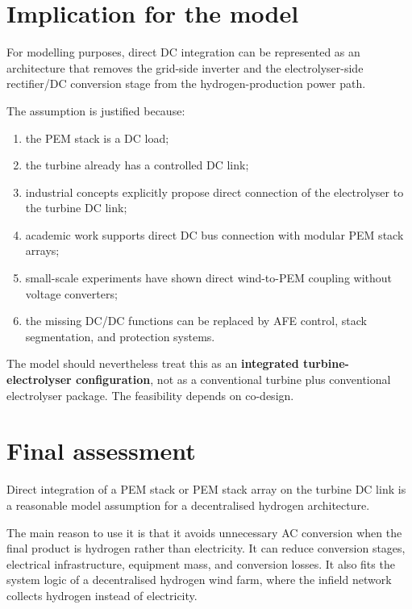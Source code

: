 \documentclass[
  letterpaper,
  DIV=11,
  numbers=noendperiod]{scrartcl}
\providecommand{\tightlist}{%
  \setlength{\itemsep}{0pt}\setlength{\parskip}{0pt}}
\begin{document}
\section{Implication for the model}\label{implication-for-the-model}

For modelling purposes, direct DC integration can be represented as an
architecture that removes the grid-side inverter and the
electrolyser-side rectifier/DC conversion stage from the
hydrogen-production power path.

The assumption is justified because:

\begin{enumerate}
\def\labelenumi{\arabic{enumi}.}
\tightlist
\item
  the PEM stack is a DC load;
\item
  the turbine already has a controlled DC link;
\item
  industrial concepts explicitly propose direct connection of the
  electrolyser to the turbine DC link;
\item
  academic work supports direct DC bus connection with modular PEM stack
  arrays;
\item
  small-scale experiments have shown direct wind-to-PEM coupling without
  voltage converters;
\item
  the missing DC/DC functions can be replaced by AFE control, stack
  segmentation, and protection systems.
\end{enumerate}

The model should nevertheless treat this as an \textbf{integrated
turbine-electrolyser configuration}, not as a conventional turbine plus
conventional electrolyser package. The feasibility depends on co-design.

\section{Final assessment}\label{final-assessment}

Direct integration of a PEM stack or PEM stack array on the turbine DC
link is a reasonable model assumption for a decentralised hydrogen
architecture.

The main reason to use it is that it avoids unnecessary AC conversion
when the final product is hydrogen rather than electricity. It can
reduce conversion stages, electrical infrastructure, equipment mass, and
conversion losses. It also fits the system logic of a decentralised
hydrogen wind farm, where the infield network collects hydrogen instead
of electricity.
\end{document}
